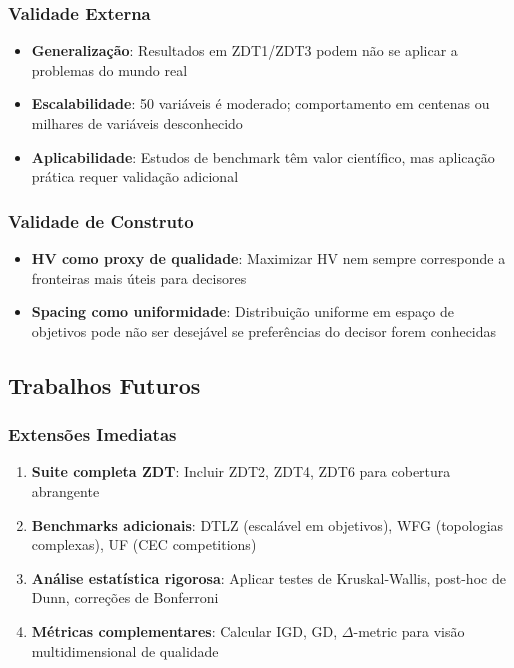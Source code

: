 \subsubsection{Validade Externa}

\begin{itemize}
    \item \textbf{Generalização}: Resultados em ZDT1/ZDT3 podem não se aplicar a problemas do mundo real
    \item \textbf{Escalabilidade}: 50 variáveis é moderado; comportamento em centenas ou milhares de variáveis desconhecido
    \item \textbf{Aplicabilidade}: Estudos de benchmark têm valor científico, mas aplicação prática requer validação adicional
\end{itemize}

\subsubsection{Validade de Construto}

\begin{itemize}
    \item \textbf{HV como proxy de qualidade}: Maximizar HV nem sempre corresponde a fronteiras mais úteis para decisores
    \item \textbf{Spacing como uniformidade}: Distribuição uniforme em espaço de objetivos pode não ser desejável se preferências do decisor forem conhecidas
\end{itemize}

\subsection{Trabalhos Futuros}

\subsubsection{Extensões Imediatas}

\begin{enumerate}
    \item \textbf{Suite completa ZDT}: Incluir ZDT2, ZDT4, ZDT6 para cobertura abrangente
    
    \item \textbf{Benchmarks adicionais}: DTLZ (escalável em objetivos), WFG (topologias complexas), UF (CEC competitions)
    
    \item \textbf{Análise estatística rigorosa}: Aplicar testes de Kruskal-Wallis, post-hoc de Dunn, correções de Bonferroni
    
    \item \textbf{Métricas complementares}: Calcular IGD, GD, $\Delta$-metric para visão multidimensional de qualidade
\end{enumerate}

